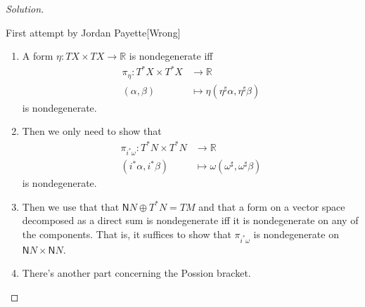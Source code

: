 \begin{proof}[Solution]
\begin{thing5}{First attempt by Jordan Payette}[Wrong]
\begin{enumerate}[label=\textbf{Step \arabic*}]
\item \begin{claim}\leavevmode
	A form $\eta:TX\times TX\to \mathbb{R}$ is nondegenerate iff
	\begin{align*}
		\pi_\eta: T^*X\times T^*X &\longrightarrow \mathbb{R} \\
		(\alpha,\beta) &\longmapsto \eta(\eta ^\sharp \alpha,\eta^\sharp\beta)
	\end{align*}
	is nondegenerate.
\end{claim}
\item Then we only need to show that
\begin{align*}
	\pi_{i^*\omega}: T^*N\times T^*N &\longrightarrow \mathbb{R} \\
	(i^*\alpha,i^*\beta) &\longmapsto \omega(\omega ^\sharp,\omega ^\sharp\beta)
\end{align*}
is nondegenerate.

\item Then we use that that $\mathsf{N}N\oplus T^*N=TM$ and that a form on a vector space decomposed as a direct sum is nondegenerate iff it is nondegenerate on any of the components. That is, it suffices to show that $\pi_{i^*\omega}$ is nondegenerate on $\mathsf{N}N\times \mathsf{N}N$.

\item There's another part concerning the Possion bracket.
\end{enumerate}
\end{thing5}
\end{proof}


\clearpage

